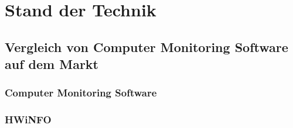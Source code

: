 \chapter{Stand der Technik}

\section{Vergleich von Computer Monitoring Software auf dem Markt}
\subsection{Computer Monitoring Software}
\subsection{HWiNFO}
